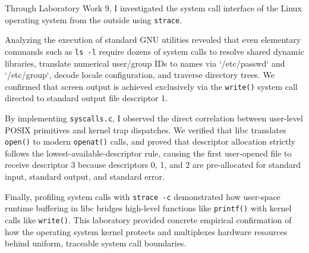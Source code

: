 \documentclass{labreport}
\begin{document}
Through Laboratory Work 9, I investigated the system call interface of the Linux operating system from the outside using \texttt{strace}.

Analyzing the execution of standard GNU utilities revealed that even elementary commands such as \texttt{ls -l} require dozens of system calls to resolve shared dynamic libraries, translate numerical user/group IDs to names via `/etc/passwd` and `/etc/group`, decode locale configuration, and traverse directory trees. We confirmed that screen output is achieved exclusively via the \texttt{write()} system call directed to standard output file descriptor 1.

By implementing \texttt{syscalls.c}, I observed the direct correlation between user-level POSIX primitives and kernel trap dispatches. We verified that libc translates \texttt{open()} to modern \texttt{openat()} calls, and proved that descriptor allocation strictly follows the lowest-available-descriptor rule, causing the first user-opened file to receive descriptor 3 because descriptors 0, 1, and 2 are pre-allocated for standard input, standard output, and standard error.

Finally, profiling system calls with \texttt{strace -c} demonstrated how user-space runtime buffering in libc bridges high-level functions like \texttt{printf()} with kernel calls like \texttt{write()}. This laboratory provided concrete empirical confirmation of how the operating system kernel protects and multiplexes hardware resources behind uniform, traceable system call boundaries.
\end{document}
